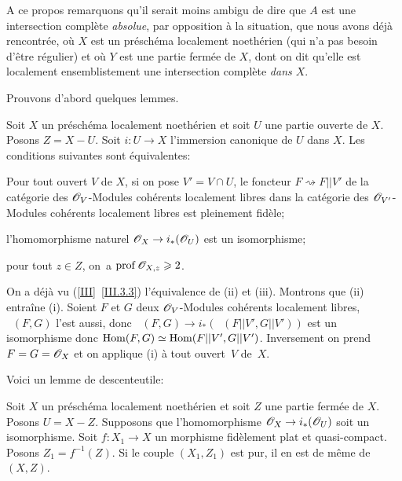 A ce propos remarquons qu'il serait moins ambigu de dire que $A$ est une intersection compl\`ete \emph{absolue}, par opposition \`a la situation, que nous avons d\'ej\`a rencontr\'ee, o\`u $X$ est un pr\'esch\'ema localement noeth\'erien (qui n'a pas besoin d'\^etre r\'egulier) et o\`u $Y$ est une partie ferm\'ee de $X$, dont on dit qu'elle est \og localement ensemblistement une intersection compl\`ete \emph{dans $X$}\fg.

Prouvons d'abord quelques lemmes.

\begin{lemme} \label{X.3.5}
Soit $X$ un pr\'esch\'ema localement noeth\'erien et soit $U$ une partie ouverte de $X$. Posons $Z=X-U$. Soit $i\colon U\to X$ l'immersion canonique de $U$ dans $X$. Les conditions suivantes sont \'equivalentes:
\begin{enumeratei}
\item
Pour tout ouvert $V$ de $X$, si on pose $V'=V\cap U$, le foncteur $F\rightsquigarrow F|{|V'}$ de la cat\'egorie des ${\mathscr O}_V$-Modules coh\'erents localement libres dans la cat\'egorie des ${\mathscr O}_{{V'}}$-Modules coh\'erents localement libres est pleinement fid\`ele;

\item
l'homomorphisme naturel $\OX \to i_\ast(\Oo_{U})$ est un isomorphisme;

\item
pour tout $z\in Z$, on~a $\operatorname{prof}{\mathscr O}_{X, z}\geqslant 2$.
\end{enumeratei}
\end{lemme}

On a d\'ej\`a vu (\ref{III}~\ref{III.3.3}) l'\'equivalence de (ii) et (iii). Montrons que (ii) entra\^ine (i). Soient $F$ et $G$ deux ${\mathscr O}_V$-Modules coh\'erents localement libres, $\mathop{\underline{\mathrm{Hom}}}\nolimits(F, G)$ l'est aussi, donc $\mathop{\underline{\mathrm{Hom}}}\nolimits(F, G)\to i_\ast(\mathop{\underline{\mathrm{Hom}}}\nolimits(F|{|V'}, G|{|V'}))$ est un isomorphisme donc $\operatorname{Hom}(F, G)\simeq\operatorname{Hom}(F|{|V'}, G|{|V'})$. Inversement on prend $F=G=\mathscr{O}_X$ et on applique (i) \`a tout ouvert~$V$ de~$X$.

Voici un \og lemme de descente\fg utile:

\begin{lemme} \label{X.3.6} Soit $X$ un pr\'esch\'ema localement noeth\'erien et soit $Z$ une partie ferm\'ee de $X$. Posons $U=X-Z$. Supposons que l'homomorphisme $\OX \to i_\ast(\Oo_U)$ soit un isomorphisme. Soit $f\colon X_1\to X$ un morphisme fid\`element plat et quasi-compact. Posons $Z_1=f^{-1}(Z)$. Si le couple $(X_1, Z_1)$ est pur, il en est de m\^eme de $(X, Z)$.
\end{lemme}


